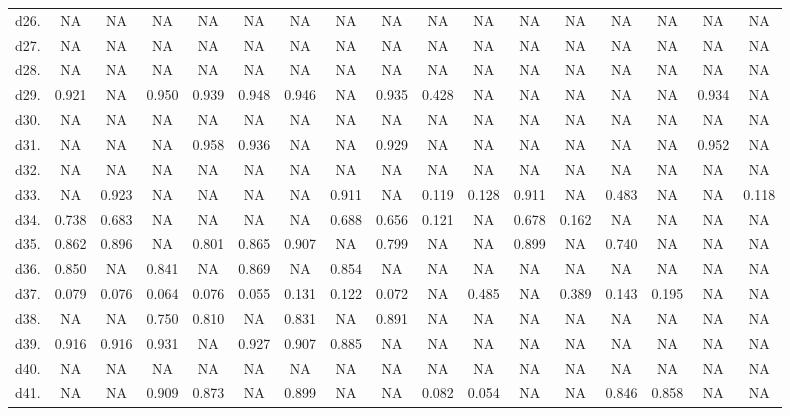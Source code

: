 \begin{table}
\begin{tabular}{lcccccccccccccccc}
d26. & NA    & NA    & NA    & NA    & NA    & NA    & NA    & NA    & NA    & NA    & NA    & NA    & NA    & NA    & NA    & NA \\
d27. & NA    & NA    & NA    & NA    & NA    & NA    & NA    & NA    & NA    & NA    & NA    & NA    & NA    & NA    & NA    & NA \\
d28. & NA    & NA    & NA    & NA    & NA    & NA    & NA    & NA    & NA    & NA    & NA    & NA    & NA    & NA    & NA    & NA \\
d29. & 0.921 & NA    & 0.950 & 0.939 & 0.948 & 0.946 & NA    & 0.935 & 0.428 & NA    & NA    & NA    & NA    & NA    & 0.934 & NA \\
d30. & NA    & NA    & NA    & NA    & NA    & NA    & NA    & NA    & NA    & NA    & NA    & NA    & NA    & NA    & NA    & NA \\
d31. & NA    & NA    & NA    & 0.958 & 0.936 & NA    & NA    & 0.929 & NA    & NA    & NA    & NA    & NA    & NA    & 0.952 & NA \\
d32. & NA    & NA    & NA    & NA    & NA    & NA    & NA    & NA    & NA    & NA    & NA    & NA    & NA    & NA    & NA    & NA \\
d33. & NA    & 0.923 & NA    & NA    & NA    & NA    & 0.911 & NA    & 0.119 & 0.128 & 0.911 & NA    & 0.483 & NA    & NA    & 0.118 \\
d34. & 0.738 & 0.683 & NA    & NA    & NA    & NA    & 0.688 & 0.656 & 0.121 & NA    & 0.678 & 0.162 & NA    & NA    & NA    & NA \\
d35. & 0.862 & 0.896 & NA    & 0.801 & 0.865 & 0.907 & NA    & 0.799 & NA    & NA    & 0.899 & NA    & 0.740 & NA    & NA    & NA \\
d36. & 0.850 & NA    & 0.841 & NA    & 0.869 & NA    & 0.854 & NA    & NA    & NA    & NA    & NA    & NA    & NA    & NA    & NA \\
d37. & 0.079 & 0.076 & 0.064 & 0.076 & 0.055 & 0.131 & 0.122 & 0.072 & NA    & 0.485 & NA    & 0.389 & 0.143 & 0.195 & NA    & NA \\
d38. & NA    & NA    & 0.750 & 0.810 & NA    & 0.831 & NA    & 0.891 & NA    & NA    & NA    & NA    & NA    & NA    & NA    & NA \\
d39. & 0.916 & 0.916 & 0.931 & NA    & 0.927 & 0.907 & 0.885 & NA    & NA    & NA    & NA    & NA    & NA    & NA    & NA    & NA \\
d40. & NA    & NA    & NA    & NA    & NA    & NA    & NA    & NA    & NA    & NA    & NA    & NA    & NA    & NA    & NA    & NA \\
d41. & NA    & NA    & 0.909 & 0.873 & NA    & 0.899 & NA    & NA    & 0.082 & 0.054 & NA    & NA    & 0.846 & 0.858 & NA    & NA \\

\end{tabular}
\end{table}
